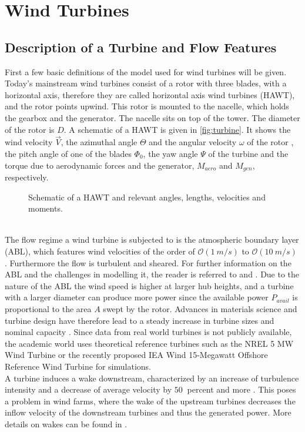 \section{Wind Turbines}
\subsection{Description of a Turbine and Flow Features}
First a few basic definitions of the model used for wind turbines will be given. Today's mainstream wind turbines consist of a rotor with three blades, with a horizontal axis, therefore they are called horizontal axis wind turbines (HAWT), and the rotor points upwind.  This rotor is mounted to the nacelle, which holds the gearbox and the generator. The nacelle sits on top of the tower. The diameter of the rotor is $D$. A schematic of a HAWT is given in \autoref{fig:turbine}. It shows the wind velocity $\vec{V}$, the azimuthal angle $\Theta$ and the angular velocity $\omega$ of the rotor , the pitch angle of one of the blades $\Phi_0$, the yaw angle $\Psi$ of the turbine and the torque due to aerodynamic forces and the generator, $M_{aero}$ and $M_{gen}$, respectively.
\begin{figure}[h]
	\centering
	\def\svgwidth{0.5 \textwidth}
	
	\caption{Schematic of a HAWT and relevant angles, lengths, velocities and moments.}
	\label{fig:turbine}
\end{figure}\\
The flow regime a wind turbine is subjected to is the atmospheric boundary layer (ABL), which features wind velocities of the order of $\mathcal{O}(\SI{1}{m/s})$ to $\mathcal{O}(\SI{10}{m/s})$ \cite[p. 5]{kaimal_atmospheric_1994}. Furthermore the flow is turbulent and sheared. For further information on the ABL and the challenges in modelling it, the reader is referred to \cite{kaimal_atmospheric_1994} and \cite{holtslag_stable_2013}. Due to the nature of the ABL the wind speed is higher at larger hub heights, and a turbine with a larger diameter can produce more power since the available power $P_{avail}$ is proportional to the area $A$ swept by the rotor. Advances in materials science and turbine design have therefore lead to a steady increase in turbine sizes and nominal capacity \cite{rohrig_powering_2019}. Since data from real world turbines is not publicly available, the academic world uses theoretical reference turbines such as the NREL 5 MW Wind Turbine \cite{jonkman_definition_2009} or the recently proposed IEA Wind 15-Megawatt Offshore Reference Wind Turbine \cite{gaertner_iea_2020} for simulations.\cite{hansen_aerodynamics_2008} \\
A turbine induces a wake downstream, characterized by an increase of turbulence intensity and a decrease of average velocity by $\SI{50}{}$ percent and more \cite{abkar_wake_2016}. This poses a problem in wind farms, where the wake of the upstream turbines decreases the inflow velocity of the downstream turbines and thus the generated power. More details on wakes can be found in \cite{boersma_tutorial_2017}.

